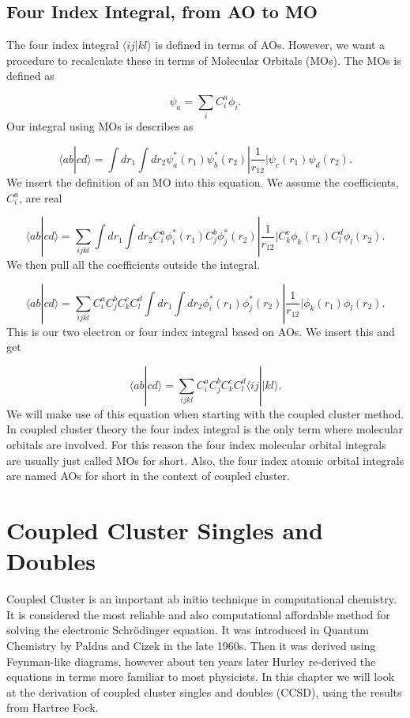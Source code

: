 \documentclass[a4paper,norsk,11pt,twoside]{report}
\begin{document}
\section{Four Index Integral, from AO to MO}
The four index integral $\langle i j | k l \rangle$ is defined in
terms of AOs. However, we want a procedure to recalculate these in
terms of Molecular Orbitals (MOs). The MOs is defined as

\begin{equation}
\psi_a = \sum_i C_i^a \phi_i .
\end{equation}
Our integral using MOs is describes as

\begin{equation}
\langle a b | c d \rangle = 
\int dr_1 \int dr_2 \psi_a^*(r_1) \psi_b^*(r_2) | \frac{1}{r_{12}} | \psi_c(r_1) \psi_d(r_2) .
\end{equation}
We insert the definition of an MO into this equation. We assume the coefficients, $C_i^a$, are real

\begin{equation}
\langle a b | c d \rangle = 
\sum_{ijkl} \int dr_1 \int dr_2 C_i^a \phi_i^*(r_1) C_j^b \phi_j^*(r_2) | \frac{1}{r_{12}} | C_k^c \phi_k(r_1) C_l^d \phi_l(r_2) .
\end{equation}
We then pull all the coefficients outside the integral.

\begin{equation}
\langle a b | c d \rangle = 
\sum_{ijkl} C_i^a C_j^b C_k^c C_l^d \int dr_1 \int dr_2 \phi_i^*(r_1) \phi_j^*(r_2) | \frac{1}{r_{12}} | \phi_k(r_1)  \phi_l(r_2) .
\end{equation}
This is our two electron or four index integral based on AOs. We insert this and get

\begin{equation}
\langle ab | cd \rangle = \sum_{ijkl} C_i^a C_j^b C_k^c C_l^d \langle ij||kl \rangle .
\end{equation} 
We will make use of this equation when starting with the coupled
cluster method. In coupled cluster theory the four index integral is
the only term where molecular orbitals are involved. For this reason
the four index molecular orbital integrals are usually just called MOs
for short. Also, the four index atomic orbital integrals are named AOs
for short in the context of coupled cluster. 



\chapter{Coupled Cluster Singles and Doubles}
Coupled Cluster is an important ab initio technique in computational chemistry. It is considered the most reliable and also computational affordable method for solving the electronic Schr\"{o}dinger equation. It was introduced in Quantum Chemistry by Paldus and Cizek in the late 1960s. Then it was derived using Feynman-like diagrams, however about ten years later Hurley re-derived the equations in terms more familiar to most physicists. In this chapter we will look at the derivation of coupled cluster singles and doubles (CCSD), using the results from Hartree Fock. \\
\end{document}
